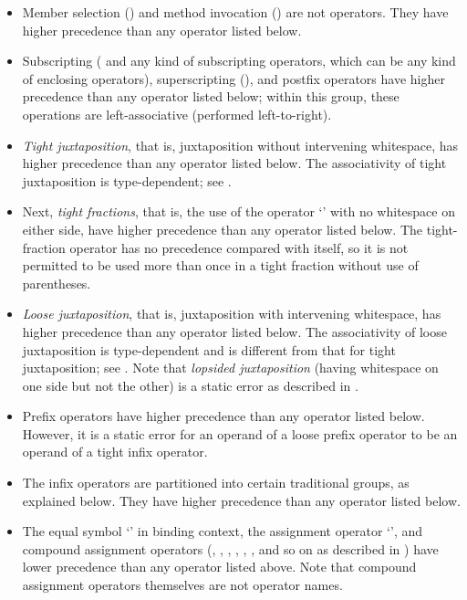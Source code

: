 \begin{itemize}
\item
Member selection () and method invocation
() are not operators.  They have higher precedence
than any operator listed below.

\item
Subscripting (\txt{[ ]} and any kind of subscripting operators,
which can be any kind of enclosing operators),
superscripting (),
and postfix operators have higher precedence than any operator
listed below; within this group, these operations are left-associative
(performed left-to-right).

\item
\emph{Tight juxtaposition}, that is, juxtaposition without intervening
whitespace, has higher precedence than any operator listed below.  The
associativity of tight juxtaposition is type-dependent;
see .

\item
Next, \emph{tight fractions}, that is,
the use of the operator `\EXP{/}' with no whitespace on either side,
have higher precedence than any operator listed below.
The tight-fraction operator has no precedence compared with itself,
so it is not permitted to be used more than once in a tight fraction
without use of parentheses.

\item
\emph{Loose juxtaposition}, that is, juxtaposition with intervening
whitespace, has higher precedence than any operator listed below.  The
associativity of loose juxtaposition is type-dependent and is
different from that for tight juxtaposition; see .
Note that \emph{lopsided juxtaposition}
(having whitespace on one side but not the other) is a static error as
described in .


\item
Prefix operators have higher precedence than any operator listed below.
However, it is a static error for an operand of a loose prefix operator
to be an operand of a tight infix operator.

\item
The infix operators are partitioned into certain traditional groups, as
explained below.  They have higher precedence than any operator listed below.

\item
The equal symbol `\EXP{=}' in binding context,
the assignment operator `\EXP{\ASSIGN}', and
compound assignment operators (\EXP{\mathrel{+}=}, \EXP{-=}, \EXP{\wedge=},
\EXP{\vee=}, \EXP{\cap=}, \EXP{\cup=}, and so on as described in
)
have lower precedence than any operator listed above.
Note that compound assignment operators themselves are not operator names.
\end{itemize}

